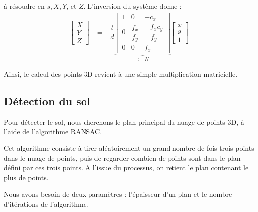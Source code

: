 \documentclass[titlepage,11pt,a4paper]{article}
\begin{document}
à résoudre en $s, X, Y$, et $Z$. L'inversion du système donne : 
 \begin{displaymath}
	\begin{split}
		\begin{bmatrix}
			X \\
			Y \\
			Z
		\end{bmatrix}
		 &= - \dfrac{t}{d}
		\underbrace{
		\begin{bmatrix}
			1 & 0 & -c_{x} \\
			0 & \dfrac{f_{x}}{f_{y}} & \dfrac{-f_{x} c_{y}}{f_{y}} \\
			0 & 0 & f_{x}
		\end{bmatrix}}_{:=N}
		\begin{bmatrix}
			x \\
			y \\
			1
		\end{bmatrix}
	\end{split}
\end{displaymath}

Ainsi, le calcul des points 3D revient à une simple multiplication matricielle.


\subsection{Détection du sol}
\par Pour détecter le sol, nous cherchons le plan principal du nuage de points 3D, à l'aide de l'algorithme RANSAC.

\par Cet algorithme consiste à tirer aléatoirement un grand nombre de fois trois points dans le nuage de points, puis de regarder combien de points sont dans le plan défini par ces trois points. A l'issue du processus, on retient le plan contenant le plus de points.

\par Nous avons besoin de deux paramètres : l'épaisseur d'un plan et le nombre d'itérations de l'algorithme.
\end{document}
